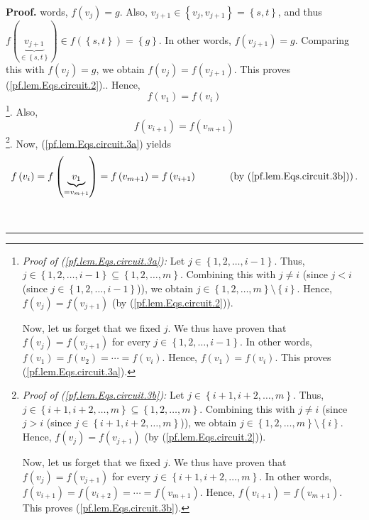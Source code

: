 \documentclass[numbers=enddot,12pt,final,onecolumn,notitlepage]{scrartcl}%
\theoremstyle{definition}
\newenvironment{proof}[1][Proof]{\noindent\textbf{#1.} }{\ \rule{0.5em}{0.5em}}
\newenvironment{verlong}{}{}
\begin{document}
\begin{verlong}
\begin{proof}
{words, $f\left(  v_{j}\right)  =g$. Also, $v_{j+1}\in\left\{  v_{j}%
,v_{j+1}\right\}  =\left\{  s,t\right\}  $, and thus $f\left(
\underbrace{v_{j+1}}_{\in\left\{  s,t\right\}  }\right)  \in f\left(  \left\{
s,t\right\}  \right)  =\left\{  g\right\}  $. In other words, $f\left(
v_{j+1}\right)  =g$. Comparing this with $f\left(  v_{j}\right)  =g$, we
obtain $f\left(  v_{j}\right)  =f\left(  v_{j+1}\right)  $. This proves
(\ref{pf.lem.Eqs.circuit.2}).}. Hence,%
\begin{equation}
f\left(  v_{1}\right)  =f\left(  v_{i}\right)  \label{pf.lem.Eqs.circuit.3a}%
\end{equation}
\footnote{\textit{Proof of (\ref{pf.lem.Eqs.circuit.3a}):} Let $j\in\left\{
1,2,\ldots,i-1\right\}  $. Thus, $j\in\left\{  1,2,\ldots,i-1\right\}
\subseteq\left\{  1,2,\ldots,m\right\}  $. Combining this with $j\neq i$
(since $j<i$ (since $j\in\left\{  1,2,\ldots,i-1\right\}  $)), we obtain
$j\in\left\{  1,2,\ldots,m\right\}  \setminus\left\{  i\right\}  $. Hence,
$f\left(  v_{j}\right)  =f\left(  v_{j+1}\right)  $ (by
(\ref{pf.lem.Eqs.circuit.2})).
\par
Now, let us forget that we fixed $j$. We thus have proven that $f\left(
v_{j}\right)  =f\left(  v_{j+1}\right)  $ for every $j\in\left\{
1,2,\ldots,i-1\right\}  $. In other words, $f\left(  v_{1}\right)  =f\left(
v_{2}\right)  =\cdots=f\left(  v_{i}\right)  $. Hence, $f\left(  v_{1}\right)
=f\left(  v_{i}\right)  $. This proves (\ref{pf.lem.Eqs.circuit.3a}).}. Also,%
\begin{equation}
f\left(  v_{i+1}\right)  =f\left(  v_{m+1}\right)
\label{pf.lem.Eqs.circuit.3b}%
\end{equation}
\footnote{\textit{Proof of (\ref{pf.lem.Eqs.circuit.3b}):} Let $j\in\left\{
i+1,i+2,\ldots,m\right\}  $. Thus, $j\in\left\{  i+1,i+2,\ldots,m\right\}
\subseteq\left\{  1,2,\ldots,m\right\}  $. Combining this with $j\neq i$
(since $j>i$ (since $j\in\left\{  i+1,i+2,\ldots,m\right\}  $)), we obtain
$j\in\left\{  1,2,\ldots,m\right\}  \setminus\left\{  i\right\}  $. Hence,
$f\left(  v_{j}\right)  =f\left(  v_{j+1}\right)  $ (by
(\ref{pf.lem.Eqs.circuit.2})).
\par
Now, let us forget that we fixed $j$. We thus have proven that $f\left(
v_{j}\right)  =f\left(  v_{j+1}\right)  $ for every $j\in\left\{
i+1,i+2,\ldots,m\right\}  $. In other words, $f\left(  v_{i+1}\right)
=f\left(  v_{i+2}\right)  =\cdots=f\left(  v_{m+1}\right)  $. Hence, $f\left(
v_{i+1}\right)  =f\left(  v_{m+1}\right)  $. This proves
(\ref{pf.lem.Eqs.circuit.3b}).}. Now, (\ref{pf.lem.Eqs.circuit.3a}) yields%
\[
f\left(  v_{i}\right)  =f\left(  \underbrace{v_{1}}_{=v_{m+1}}\right)
=f\left(  v_{m+1}\right)  =f\left(  v_{i+1}\right)
\ \ \ \ \ \ \ \ \ \ \left(  \text{by (\ref{pf.lem.Eqs.circuit.3b})}\right)  .
\]



\end{proof}
\end{verlong}
\end{document}

